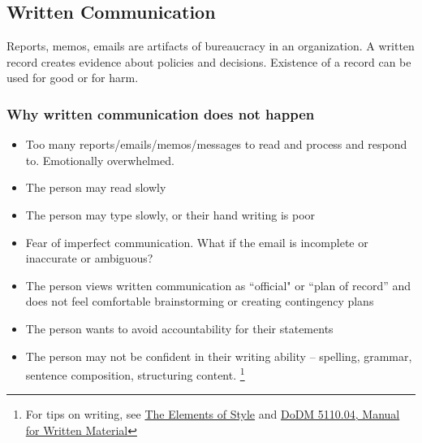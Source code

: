 \subsection{Written Communication\label{sec:written-communication}}

Reports, memos, emails are artifacts of bureaucracy in an organization. A written record creates evidence about policies and decisions. Existence of a record can be used for good or for harm.







\subsubsection{Why written communication does not happen\label{sec:written-comm-does-not-happen}}
\begin{itemize}
    \item Too many reports/emails/memos/messages to read and process and respond to. Emotionally overwhelmed.
\item The person may read slowly
\item The person may type slowly, or their hand writing is poor
\item Fear of imperfect communication. What if the email is incomplete or inaccurate or ambiguous?
\item The person views written communication as ``official" or ``plan of record'' and does not feel comfortable brainstorming or creating contingency plans
\item The person wants to avoid accountability for their statements
\item The person may not be confident in their writing ability -- spelling, grammar, sentence composition, structuring content. \footnote{For tips on writing, see 
\href{https://en.wikipedia.org/wiki/The_Elements_of_Style}{The Elements of Style}
and
\href{https://www.google.com/search?q=dodm+5110.04}{DoDM 5110.04, Manual for Written Material}}
\end{itemize}

